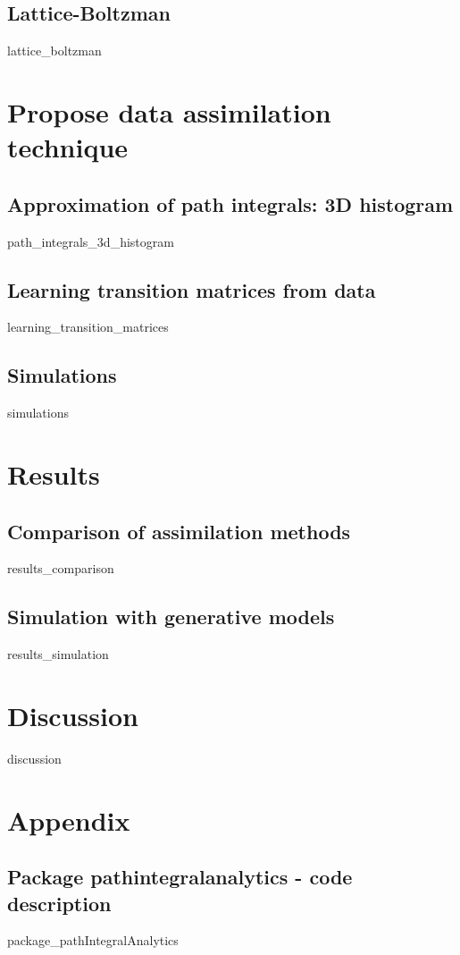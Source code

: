\documentclass[10pt,a4paper]{report}
\begin{document}
\section{Lattice-Boltzman}
{lattice_boltzman}



\chapter{Propose data assimilation technique}

\section{Approximation of path integrals: 3D histogram}
{path_integrals_3d_histogram}

\section{Learning transition matrices from data}
{learning_transition_matrices}

\section{Simulations}
{simulations}



\chapter{Results}

\section{Comparison of assimilation methods}
{results_comparison}

\section{Simulation with generative models}
{results_simulation}



\chapter{Discussion}

{discussion}



\chapter{Appendix}

\section{Package pathintegralanalytics - code description}
{package_pathIntegralAnalytics}
\end{document}
